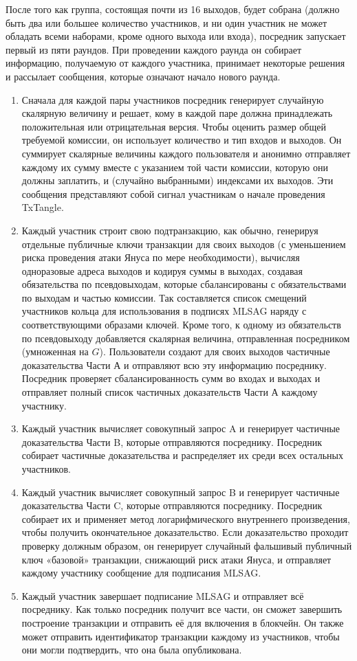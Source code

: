 После того как группа, состоящая почти из 16 выходов, будет собрана (должно быть два или большее количество участников, и ни один участник не может обладать всеми наборами, кроме одного выхода или входа), посредник запускает первый из пяти раундов. При проведе\-нии каждого раунда он собирает информацию, получаемую от каждого участника, принимает некоторые решения и рассылает сообщения, которые означают начало нового раунда.
\begin{enumerate}
    \item Сначала для каждой пары участников посредник генерирует случайную скалярную величину и решает, кому в каждой паре должна принадлежать положительная или отрицательная версия. Чтобы оценить размер общей требуемой комиссии, он использует количество и тип входов и выходов. Он суммирует скалярные величины каждого поль\-зователя и анонимно отправляет каждому их сумму вместе с указанием той части комиссии, которую они должны заплатить, и (случайно выбранными) индексами их выходов. Эти сообщения представляют собой сигнал участникам о начале проведения TxTangle.
    \item Каждый участник строит свою подтранзакцию, как обычно, генерируя отдельные пуб\-личные ключи транзакции для своих выходов (с уменьшением риска проведения атаки Януса по мере необходимости), вычисляя одноразовые адреса выходов и кодируя суммы в выходах, создавая обязательства по псевдовыходам, которые сбалансированы с обяза\-тельствами по выходам и частью комиссии. Так составляется список смещений участни\-ков кольца для использования в подписях MLSAG наряду с соответствующими образами ключей. Кроме того, к одному из обязательств по псевдовыходу добавляется скалярная величина, отправленная посредником (умноженная на $G$). Пользователи создают для своих выходов частичные доказательства Части А и отправляют всю эту информацию посреднику. Посредник проверяет сбалансированность сумм во входах и выходах и отправляет полный список частичных доказательств Части А каждому участнику.
    \item Каждый участник вычисляет совокупный запрос A и генерирует частичные доказатель\-ства Части B, которые отправляются посреднику. Посредник собирает частичные дока\-зательства и распределяет их среди всех остальных участников.
    \item Каждый участник вычисляет совокупный запрос B и генерирует частичные доказатель\-ства Части C, которые отправляются посреднику. Посредник собирает их и применяет метод логарифмического внутреннего произведения, чтобы получить окончательное до\-казательство. Если доказательство проходит проверку должным образом, он генерирует случайный фальшивый публичный ключ «базовой» транзакции, снижающий риск атаки Януса, и отправляет каждому участнику сообщение для подписания MLSAG.
    \item Каждый участник завершает подписание MLSAG и отправляет всё посреднику. Как только посредник получит все части, он сможет завершить построение транзакции и отправить её для включения в блокчейн. Он также может отправить идентификатор транзакции каждому из участников, чтобы они могли подтвердить, что она была опубли\-кована.
\end{enumerate}{}